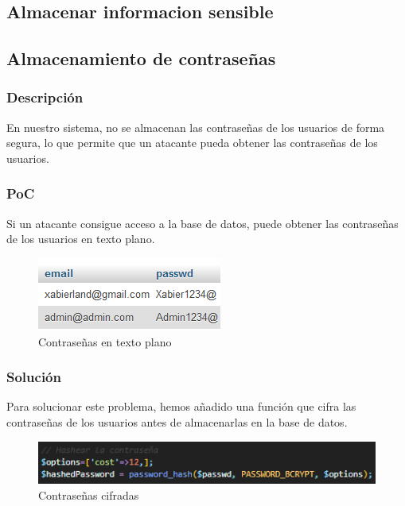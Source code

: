 \documentclass{report}
\begin{document}
            \subsection{Almacenar informacion sensible}
            \subsection{Almacenamiento de contraseñas}
                \subsubsection{Descripción}
                    En nuestro sistema, no se almacenan las contraseñas de los usuarios de forma segura, lo que permite que un atacante pueda obtener las contraseñas de los usuarios.
                \subsubsection{PoC}
                    Si un atacante consigue acceso a la base de datos, puede obtener las contraseñas de los usuarios en texto plano.
                    \begin{figure}[H]
                        \centering
                        \includegraphics[width=\textwidth]{./img/vulnerabilidades/3.2.4.1.png}
                        \caption{Contraseñas en texto plano}
                    \end{figure}
                \subsubsection{Solución}
                    Para solucionar este problema, hemos añadido una función que cifra las contraseñas de los usuarios antes de almacenarlas en la base de datos.
                    \begin{figure}[H]
                        \centering
                        \includegraphics[width=\textwidth]{./img/vulnerabilidades/3.2.4.2.png}
                        \caption{Contraseñas cifradas}
                    \end{figure}
\end{document}
